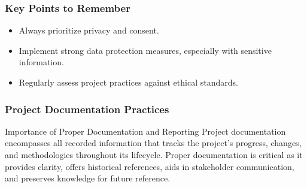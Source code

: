 \documentclass[aspectratio=169]{beamer}
\begin{document}
\begin{frame}[fragile]
    \frametitle{Key Points to Remember}
    \begin{itemize}
        \item Always prioritize privacy and consent.
        \item Implement strong data protection measures, especially with sensitive information.
        \item Regularly assess project practices against ethical standards.
    \end{itemize}
\end{frame}

\begin{frame}[fragile]
    \frametitle{Project Documentation Practices}
    \begin{block}{Importance of Proper Documentation and Reporting}
        Project documentation encompasses all recorded information that tracks the project’s progress, changes, and methodologies throughout its lifecycle.
        Proper documentation is critical as it provides clarity, offers historical references, aids in stakeholder communication, and preserves knowledge for future reference.
    \end{block}
\end{frame}
\end{document}
